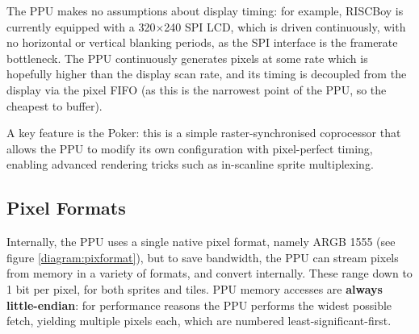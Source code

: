 \documentclass[notitlepage]{article}
\begin{document}
The PPU makes no assumptions about display timing: for example, RISCBoy is currently equipped with a 320$\times$240 SPI LCD, which is driven continuously, with no horizontal or vertical blanking periods, as the SPI interface is the framerate bottleneck. The PPU continuously generates pixels at some rate which is hopefully higher than the display scan rate, and its timing is decoupled from the display via the pixel FIFO (as this is the narrowest point of the PPU, so the cheapest to buffer).

A key feature is the Poker: this is a simple raster-synchronised coprocessor that allows the PPU to modify its own configuration with pixel-perfect timing, enabling advanced rendering tricks such as in-scanline sprite multiplexing.

\subsection{Pixel Formats}

Internally, the PPU uses a single native pixel format, namely ARGB 1555 (see figure \ref{diagram:pixformat}), but to save bandwidth, the PPU can stream pixels from memory in a variety of formats, and convert internally. These range down to 1 bit per pixel, for both sprites and tiles. PPU memory accesses are \textbf{always little-endian}: for performance reasons the PPU performs the widest possible fetch, yielding multiple pixels each, which are numbered least-significant-first.
\end{document}
